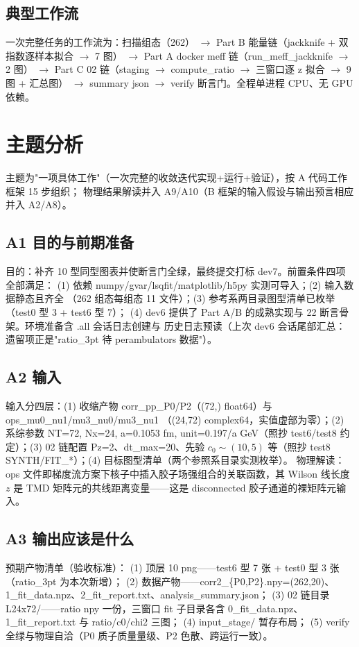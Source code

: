 \documentclass[UTF8]{ctexart}
\begin{document}
\subsection{典型工作流}
一次完整任务的工作流为：扫描组态（262） $\to$ Part B 能量链（jackknife + 双指数逐样本拟合
$\to$ 7 图） $\to$ Part A docker meff 链（run\_meff\_jackknife $\to$ 2 图） $\to$
Part C 02 链（staging $\to$ compute\_ratio $\to$ 三窗口逐 z 拟合 $\to$ 9 图 + 汇总图）
$\to$ summary json $\to$ verify 断言门。全程单进程 CPU、无 GPU 依赖。

\section{主题分析}
主题为"一项具体工作"（一次完整的收敛迭代实现+运行+验证），按 A 代码工作框架 15 步组织；
物理结果解读并入 A9/A10（B 框架的输入假设与输出预言相应并入 A2/A8）。

\subsection{A1 目的与前期准备}
目的：补齐 10 型同型图表并使断言门全绿，最终提交打标 dev7。前置条件四项全部满足：
(1) 依赖 numpy/gvar/lsqfit/matplotlib/h5py 实测可导入；(2) 输入数据静态且齐全
（262 组态每组态 11 文件）；(3) 参考系两目录图型清单已枚举（test0 型 3 + test6 型 7）；
(4) dev6 提供了 Part A/B 的成熟实现与 22 断言骨架。环境准备含 .all 会话日志创建与
历史日志预读（上次 dev6 会话尾部汇总：遗留项正是"ratio\_3pt 待 perambulators 数据"）。

\subsection{A2 输入}
输入分四层：(1) 收缩产物 corr\_pp\_P0/P2（(72,) float64）与 ops\_mu0\_nu1/mu3\_nu0/mu3\_nu1
（(24,72) complex64，实值虚部为零）；(2) 系综参数 NT=72, Nx=24, a=0.1053 fm,
unit=0.197/a GeV（照抄 test6/test8 约定）；(3) 02 链配置 Pz=2、dt\_max=20、先验
$c_0\sim(10,5)$ 等（照抄 test8 SYNTH/FIT\_*）；(4) 目标图型清单（两个参照系目录实测枚举）。
物理解读：ops 文件即梯度流方案下核子中插入胶子场强组合的关联函数，其 Wilson 线长度 $z$
是 TMD 矩阵元的共线距离变量——这是 disconnected 胶子通道的裸矩阵元输入。

\subsection{A3 输出应该是什么}
预期产物清单（验收标准）：
(1) 顶层 10 png——test6 型 7 张 + test0 型 3 张（ratio\_3pt 为本次新增）；
(2) 数据产物——corr2\_\{P0,P2\}.npy=(262,20)、1\_fit\_data.npz、2\_fit\_report.txt、analysis\_summary.json；
(3) 02 链目录 L24x72/——ratio npy 一份，三窗口 fit 子目录各含 0\_fit\_data.npz、
1\_fit\_report.txt 与 ratio/c0/chi2 三图；
(4) input\_stage/ 暂存布局；
(5) verify 全绿与物理自洽（P0 质子质量量级、P2 色散、跨运行一致）。
\end{document}

